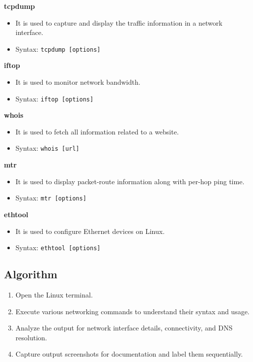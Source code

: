 \documentclass{article}
\begin{document}
\noindent\textbf{tcpdump}
\begin{itemize}
    \item It is used to capture and display the traffic information in a network interface.
    \item Syntax: \texttt{tcpdump [options]}
\end{itemize}

\noindent\textbf{iftop}
\begin{itemize}
    \item It is used to monitor network bandwidth.
    \item Syntax: \texttt{iftop [options]}
\end{itemize}

\noindent\textbf{whois}
\begin{itemize}
    \item It is used to fetch all information related to a website.
    \item Syntax: \texttt{whois [url]}
\end{itemize}

\noindent\textbf{mtr}
\begin{itemize}
    \item It is used to display packet-route information along with per-hop ping time.
    \item Syntax: \texttt{mtr [options]}
\end{itemize}

\noindent\textbf{ethtool}
\begin{itemize}
    \item It is used to configure Ethernet devices on Linux.
    \item Syntax: \texttt{ethtool [options]}
\end{itemize}

\subsection*{Algorithm}
\begin{enumerate}
    \item Open the Linux terminal.
    \item Execute various networking commands to understand their syntax and usage.
    \item Analyze the output for network interface details, connectivity, and DNS resolution.
    \item Capture output screenshots for documentation and label them sequentially.
\end{enumerate}
\end{document}
